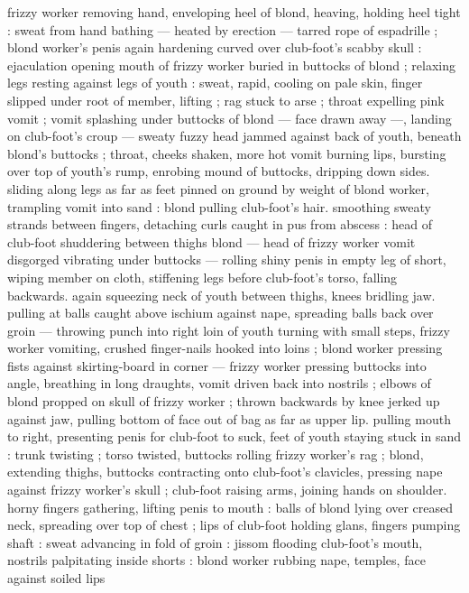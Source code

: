 frizzy worker removing hand, enveloping heel of blond, heaving, 
holding heel tight : sweat from hand bathing --- heated by erection 
--- tarred rope of espadrille ; blond worker's penis again hardening 
curved over club-foot's scabby skull : ejaculation opening mouth of 
frizzy worker buried in buttocks of blond ; relaxing legs resting 
against legs of youth : sweat, rapid, cooling on pale skin, finger 
slipped under root of member, lifting ; rag stuck to arse ; throat 
expelling pink vomit ; vomit splashing under buttocks of blond --- 
face drawn away ---, landing on club-foot's croup --- sweaty fuzzy 
head jammed against back of youth, beneath blond's buttocks ; 
throat, cheeks shaken, more hot vomit burning lips, bursting over top 
of youth's rump, enrobing mound of buttocks, dripping down sides. 
sliding along legs as far as feet pinned on ground by weight of blond 
worker, trampling vomit into sand : blond pulling club-foot's hair. 
smoothing sweaty strands between fingers, detaching curls caught in 
pus from abscess : head of club-foot shuddering between thighs 
blond --- head of frizzy worker vomit disgorged vibrating under 
buttocks --- rolling shiny penis in empty leg of short, wiping member 
on cloth, stiffening legs before club-foot's torso, falling backwards. 
again squeezing neck of youth between thighs, knees bridling jaw. 
pulling at balls caught above ischium against nape, spreading balls 
back over groin --- throwing punch into right loin of youth turning 
with small steps, frizzy worker vomiting, crushed finger-nails hooked 
into loins ; blond worker pressing fists against skirting-board in 
corner --- frizzy worker pressing buttocks into angle, breathing in 
long draughts, vomit driven back into nostrils ; elbows of blond 
propped on skull of frizzy worker ; thrown backwards by knee jerked 
up against jaw, pulling bottom of face out of bag as far as upper lip. 
pulling mouth to right, presenting penis for club-foot to suck, feet of 
youth staying stuck in sand : trunk twisting ; torso twisted, buttocks 
rolling frizzy worker's rag ; blond, extending thighs, buttocks 
contracting onto club-foot's clavicles, pressing nape against frizzy 
worker's skull ; club-foot raising arms, joining hands on shoulder. 
horny fingers gathering, lifting penis to mouth : balls of blond lying 
over creased neck, spreading over top of chest ; lips of club-foot 
holding glans, fingers pumping shaft : sweat advancing in fold of 
groin : jissom flooding club-foot's mouth, nostrils palpitating inside 
shorts : blond worker rubbing nape, temples, face against soiled lips 
